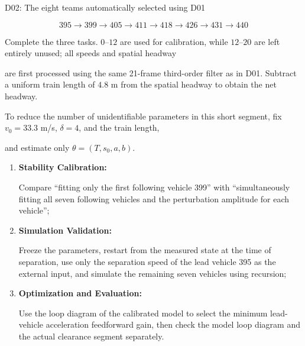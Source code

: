 \documentclass[11pt,a4paper,openany]{book}
\numberwithin{equation}{chapter}
\numberwithin{figure}{chapter}
\numberwithin{table}{chapter}
\begin{document}
\label{sub:ngsim-d02}




D02: The eight teams automatically selected using D01

\[
395\rightarrow399\rightarrow405\rightarrow411\rightarrow418
\rightarrow426\rightarrow431\rightarrow440
\]

Complete the three tasks. $0$--$12$ are used for calibration, while $12$--$20$ are left entirely unused; all speeds and spatial headway

are first processed using the same 21-frame third-order filter as in D01. Subtract a uniform train length of $4.8$ m from the spatial headway to obtain the net headway.

To reduce the number of unidentifiable parameters in this short segment, fix $v_0=33.3$ m/s, $\delta=4$, and the train length,

and estimate only $\theta=(T,s_0,a,b)$.










\begin{enumerate}[leftmargin=1.6em,itemsep=3pt]
\item \textbf{Stability Calibration:}




Compare “fitting only the first following vehicle 399” with “simultaneously fitting all seven following vehicles and the perturbation amplitude for each vehicle”;







\item \textbf{Simulation Validation:}




Freeze the parameters, restart from the measured state at the time of separation, use only the separation speed of the lead vehicle 395 as the external input, and simulate the remaining seven vehicles using recursion;







\item \textbf{Optimization and Evaluation:}




Use the loop diagram of the calibrated model to select the minimum lead-vehicle acceleration feedforward gain, then check the model loop diagram and the actual clearance segment separately.







\end{enumerate}
\end{document}
